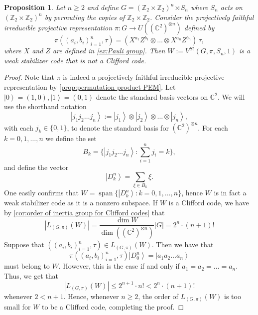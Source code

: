 \documentclass[11pt, oneside, reqno]{amsart}
\newcommand{\bbZ}{\mathbb{Z}}
\newcommand{\bbC}{\mathbb{C}}
\newcommand{\Span}{\operatorname{span}}
\newcommand{\ket}[1]{\left|#1\right\rangle}
\theoremstyle{definition}
\theoremstyle{plain}
\newtheorem{proposition}[definition]{Proposition}
\theoremstyle{remark}
\begin{document}
\begin{proposition}\label{prop:permutation invariant non-Clifford code}
    Let $n \geq 2$ and define $G = (\bbZ_2 \times \bbZ_2)^n \rtimes S_n$ where $S_n$ acts on $(\bbZ_2 \times \bbZ_2)^n$ by permuting the copies of $\bbZ_2 \times \bbZ_2$. Consider the projectively faithful irreducible projective representation $\pi \colon G \to U((\bbC^2)^{\otimes n})$ defined by
    \begin{equation*}
        \pi((a_i,b_i)_{i=1}^{n},\tau) = (X^{a_1}Z^{b_1} \otimes \dots \otimes X^{a_n}Z^{b_n}) \, \tau,
    \end{equation*}
    where $X$ and $Z$ are defined in \cref{ex:Pauli group}. Then $W := V^{St}(G, \pi, S_n, 1)$ is a weak stabilizer code that is not a Clifford code.
\end{proposition}
\begin{proof}
    Note that $\pi$ is indeed a projectively faithful irreducible projective representation by \cref{prop:permutation product PEM}. Let $\ket{0} = (1,0),\ket{1} = (0,1)$ denote the standard basis vectors on $\bbC^2$. We will use the shorthand notation
    \begin{equation*}
        \ket{j_1 j_2 \dots j_n} := \ket{j_1} \otimes \ket{j_2} \otimes \dots \otimes \ket{j_n},
    \end{equation*}
    with each $j_k \in \{0,1\}$, to denote the standard basis for $(\bbC^2)^{\otimes n}$. For each $k = 0,1,\dots,n$ we define the set
    \begin{equation*}
        B_k = \{ \ket{j_1 j_2 \dots j_n} \colon \sum_{i = 1}^{n} j_i = k \},
    \end{equation*}
    and define the vector
    \begin{equation*}
        \ket{D^n_k} = \sum_{\xi \in B_k} \xi.
    \end{equation*}
    One easily confirms that $W = \Span\{ \ket{D^n_k} \colon k = 0,1,\dots,n \}$, hence $W$ is in fact a weak stabilizer code as it is a nonzero subspace. If $W$ is a Clifford code, we have by \cref{cor:order of inertia group for Clifford codes} that
    \begin{equation*}
        |L_{(G,\pi)}(W)| 
        = \frac{\dim W}{\dim((\bbC^2)^{\otimes n})}|G|
        = 2^n \cdot (n+1)!
    \end{equation*}
    Suppose that $((a_i,b_i)_{i = 1}^{n},\tau) \in L_{(G,\pi)}(W)$. Then we have that
    \begin{equation*}
        \pi((a_i,b_i)_{i = 1}^{n},\tau)\ket{D_0^n}
        = \ket{a_1a_2 \dots a_n}
    \end{equation*}
    must belong to $W$. However, this is the case if and only if $a_1 = a_2 = \dots = a_n$. Thus, we get  that
    \begin{equation*}
        |L_{(G,\pi)}(W)| \leq 2^{n+1} \cdot n! < 2^n \cdot (n+1)!
    \end{equation*}
    whenever $2 < n + 1$. Hence, whenever $n \geq 2$, the order of $L_{(G,\pi)}(W)$ is too small for $W$ to be a Clifford code, completing the proof.
\end{proof}
\end{document}
